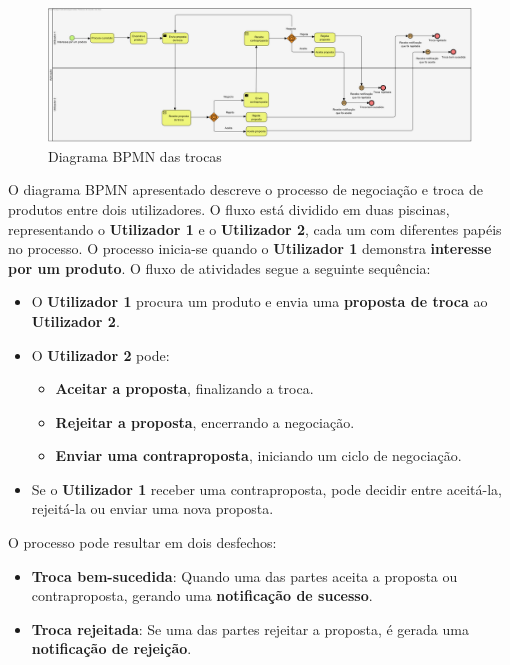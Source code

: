 \documentclass[a4paper, 12pt]{article} %
\begin{document}
\begin{figure}[ht]
	\centering
	\includegraphics[width=\textwidth]{../images/bpmn-swaps.png}
	\caption{Diagrama BPMN das trocas}
	\label{fig:bpmn trocas}
\end{figure}

 O diagrama BPMN apresentado descreve o processo de negociação e troca de produtos entre dois utilizadores. O fluxo está dividido em duas piscinas, representando o \textbf{Utilizador 1} e o \textbf{Utilizador 2}, cada um com diferentes papéis no processo. O processo inicia-se quando o \textbf{Utilizador 1} demonstra \textbf{interesse por um produto}. O fluxo de atividades segue a seguinte sequência:

\begin{itemize}
	\item O \textbf{Utilizador 1} procura um produto e envia uma \textbf{proposta de troca} ao \textbf{Utilizador 2}.
	\item O \textbf{Utilizador 2} pode:
	\begin{itemize}
		\item \textbf{Aceitar a proposta}, finalizando a troca.
		\item \textbf{Rejeitar a proposta}, encerrando a negociação.
		\item \textbf{Enviar uma contraproposta}, iniciando um ciclo de negociação.
	\end{itemize}
	\item Se o \textbf{Utilizador 1} receber uma contraproposta, pode decidir entre aceitá-la, rejeitá-la ou enviar uma nova proposta.
\end{itemize}

O processo pode resultar em dois desfechos:
\begin{itemize}
	\item \textbf{Troca bem-sucedida}: Quando uma das partes aceita a proposta ou contraproposta, gerando uma \textbf{notificação de sucesso}.
	\item \textbf{Troca rejeitada}: Se uma das partes rejeitar a proposta, é gerada uma \textbf{notificação de rejeição}.
\end{itemize}
\newpage
\end{document}
